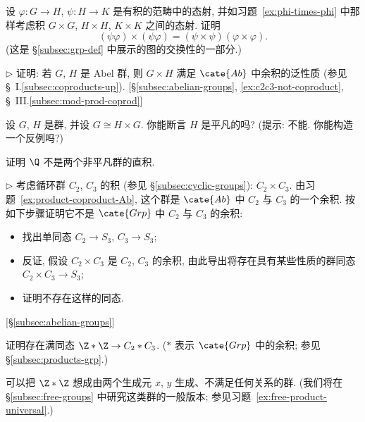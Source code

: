 \begin{prob}
\label{ex:phi-times-phi-composition}
设 $\varphi : G \to H$, $\psi : H \to K$ 是有积的范畴中的态射, 并如习题~\ref{ex:phi-times-phi} 中那样考虑积 $G \times G$, $H \times H$, $K \times K$ 之间的态射. 证明
\[
(\psi\varphi) \times (\psi\varphi) = (\psi \times \psi)(\varphi \times \varphi).
\]
(这是 \S\ref{subsec:grp-def} 中展示的图的交换性的一部分.)
\end{prob}

\begin{prob}
\label{ex:product-coproduct-Ab}
$\triangleright$ 证明: 若 $G$, $H$ 是 Abel 群, 则 $G \times H$ 满足 $\cate{Ab}$ 中余积的泛性质 (参见 \S~I.\ref{subsec:coproducts-up}). [\S\ref{subsec:abelian-groups}, \ref{ex:c2c3-not-coproduct}, \S~III.\ref{subsec:mod-prod-coprod}]
\end{prob}

\begin{prob}
\label{ex:g-times-h}
设 $G$, $H$ 是群, 并设 $G \cong H \times G$. 你能断言 $H$ 是平凡的吗? (提示: 不能. 你能构造一个反例吗?)
\end{prob}

\begin{prob}
\label{ex:Q-not-product}
证明 $\Q$ 不是两个非平凡群的直积.
\end{prob}

\begin{prob}
\label{ex:c2c3-not-coproduct}
$\triangleright$ 考虑循环群 $C_2$, $C_3$ 的积 (参见 \S\ref{subsec:cyclic-groups}): $C_2 \times C_3$. 由习题~\ref{ex:product-coproduct-Ab}, 这个群是 $\cate{Ab}$ 中 $C_2$ 与 $C_3$ 的一个余积. 按如下步骤证明它不是 $\cate{Grp}$ 中 $C_2$ 与 $C_3$ 的余积:
\begin{itemize}
	\item 找出单同态 $C_2 \to S_3$, $C_3 \to S_3$;
	\item 反证, 假设 $C_2 \times C_3$ 是 $C_2$, $C_3$ 的余积, 由此导出将存在具有某些性质的群同态 $C_2 \times C_3 \to S_3$;
	\item 证明不存在这样的同态.
\end{itemize}
[\S\ref{subsec:abelian-groups}]
\end{prob}

\begin{prob}
\label{ex:free-product-surjection}
证明存在满同态 $\Z * \Z \to C_2 * C_3$. ($*$ 表示 $\cate{Grp}$ 中的余积; 参见 \S\ref{subsec:products-grp}.)

可以把 $\Z * \Z$ 想成由两个生成元 $x$, $y$ 生成、不满足任何关系的群. (我们将在 \S\ref{subsec:free-groups} 中研究这类群的一般版本; 参见习题~\ref{ex:free-product-universal}.)
\end{prob}

